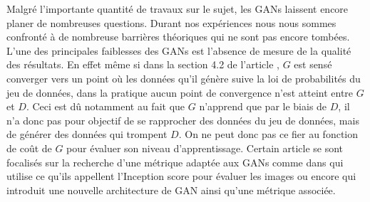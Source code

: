 \documentclass[11pt,francais]{article}
\begin{document}
Malgré l'importante quantité de travaux sur le sujet, les GANs laissent encore planer de nombreuses questions. 
Durant nos expériences nous nous sommes confronté à de nombreuse barrières théoriques qui ne sont pas encore tombées.\\
L'une des principales faiblesses des GANs est l'absence de mesure de la qualité des résultats. En effet même si dans la section 4.2 de l'article \cite{NIPS2014_5423}, \(G\) est sensé converger vers un point où les données qu'il génère suive la loi de probabilités du jeu de données, dans la pratique aucun point de convergence n'est atteint entre \(G\) et \(D\). Ceci est dû notamment au fait que \(G\) n'apprend que par le biais de \(D\), il n'a donc pas pour objectif de se rapprocher des données du jeu de données, mais de générer des données qui trompent \(D\). On ne peut donc pas ce fier au fonction de coût de \(G\) pour évaluer son niveau d'apprentissage. 
Certain article se sont focalisés sur la recherche d'une métrique adaptée aux GANs comme dans \cite{salimans2016improved} qui utilise ce qu'ils appellent l'Inception score pour évaluer les images ou encore \cite{berthelot2017began} qui introduit une nouvelle architecture de GAN ainsi qu'une métrique associée.\\
\end{document}

